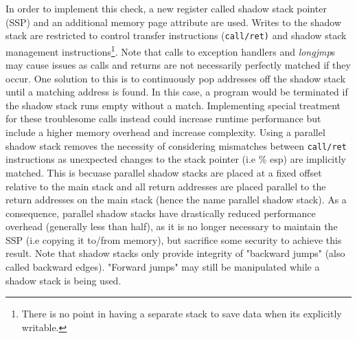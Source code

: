 \documentclass[10pt,twocolumn,a4paper]{article}
\begin{document}
In order to implement this check, a new register called shadow stack pointer (SSP) and an additional memory page attribute are used.
Writes to the shadow stack are restricted to control transfer instructions (\texttt{call/ret)} and shadow stack management instructions\footnote{There is no point in having a separate stack to save data when its explicitly writable.}\cite{CFE}.
Note that calls to exception handlers and \emph{longjmp}s may cause issues as calls and returns are not necessarily perfectly matched if they occur\cite{light}.
One solution to this is to continuously pop addresses off the shadow stack until a matching address is found. In this case, a program would be terminated if the shadow stack runs empty without a match\cite{performance}.
Implementing special treatment for these troublesome calls instead could increase runtime performance but include a higher memory overhead and increase complexity.
Using a parallel shadow stack removes the necessity of considering mismatches between \texttt{call/ret} instructions as unexpected changes to the stack pointer (i.e \% esp) are implicitly matched\cite{performance}.
This is becuase parallel shadow stacks are placed at a fixed offset relative to the main stack and all return addresses are placed parallel to the return addresses on the main stack (hence the name parallel shadow stack). 
As a consequence, parallel shadow stacks have drastically reduced performance overhead (generally less than half), as it is no longer necessary to maintain the SSP (i.e copying it to/from memory), but sacrifice some security to achieve this result\cite{performance}.
Note that shadow stacks only provide integrity of "backward jumps" (also called backward edges). "Forward jumps" may still be manipulated while a shadow stack is being used.
\end{document}
